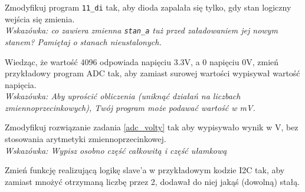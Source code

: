 \dbEntryCheckResults
  Zmodyfikuj program \Verb$11_di$ tak, aby dioda zapalała się tylko, gdy stan logiczny wejścia się zmienia.\\
  \textit{Wskazówka: co zawiera zmienna \texttt{\Verb$stan_a$} tuż przed załadowaniem jej nowym stanem? Pamiętaj
  o stanach nieustalonych.}
\fi

\dbEntryCheckResults
Wiedząc, że wartość 4096 odpowiada napięciu 3.3V, a 0 napięciu 0V, zmień przykładowy program ADC tak, aby zamiast surowej
wartości wypisywał wartość napięcia.\\
\textit{Wskazówka: Aby uprościć obliczenia (uniknąć działań na liczbach zmiennoprzecinkowych), Twój program może podawać wartość w mV.}
\fi

\dbEntryCheckResults
Zmodyfikuj rozwiązanie zadania \ref{adc_volty} tak aby wypisywało wynik w V, bez stosowania arytmetyki zmiennoprzecinkowej.\\
\textit{Wskazówka: Wypisz osobno część całkowitą i część ułamkową}
\fi

\dbEntryCheckResults
  Zmień funkcję realizującą logikę slave'a w przykładowym kodzie I2C tak, aby zamiast mnożyć otrzymaną liczbę przez 2, dodawał do niej jakąś
  (dowolną) stałą.
\fi
